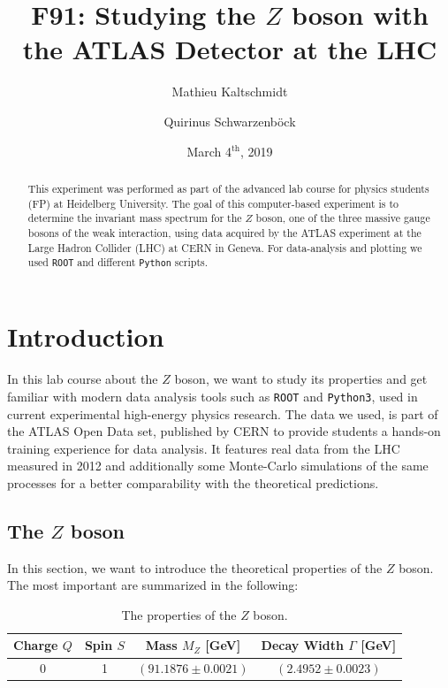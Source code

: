 \documentclass[twocolumn,
			   showpacs,%
               nofootinbib,
               aps,%
               prd,
               notitlepage,
               showkeys,
               10pt]{revtex4-1}
\begin{document}
{\hypersetup{allcolors=black}
\title{F91: Studying the $Z$ boson with the ATLAS Detector at the LHC }
\author{Mathieu Kaltschmidt}
\author{Quirinus Schwarzenb\"ock}

\date[Carried out in the week of  ]{March 4$^{\text{th}}$, 2019}


\begin{abstract}
This experiment was performed as part of the advanced lab course for physics students (FP) at Heidelberg University.
The goal of this computer-based experiment is to determine the invariant mass spectrum for the $Z$ boson, one of the three massive gauge bosons of the weak interaction, using data acquired by the ATLAS experiment at the Large Hadron Collider (LHC) at CERN in Geneva. For data-analysis  and plotting we used \verb|ROOT| and different \verb|Python| scripts.
\end{abstract}

\maketitle


}
\section{Introduction}
In this lab course about the $Z$ boson, we want to study its properties and get familiar with modern data analysis tools such as \verb|ROOT| and \verb|Python3|, used in current experimental high-energy physics research. The data we used, is part of the ATLAS Open Data set, published by CERN to provide students a hands-on training experience for data analysis. It features real data from the LHC measured in 2012 and additionally some Monte-Carlo simulations of the same processes for a better comparability with the theoretical predictions.

\subsection{The $Z$ boson}
In this section, we want to introduce the theoretical properties of the $Z$ boson. The most important are summarized in the following:

\begin{table}[!htbp]
	\centering
	\renewcommand{\arraystretch}{1.5}
	\begin{tabular}{c|c|c|c}
	Charge $Q$ & Spin $S$ & Mass $M_Z$ [GeV] & Decay Width $\Gamma$ [GeV] \\ \hline 
	 0 & 1 & $(91.1876 \pm 0.0021)$ & $(2.4952 \pm 0.0023)$ \\
		\end{tabular}
	\caption{\label{tab:Z_props}The properties of the $Z$ boson.}
\end{table}
\end{document}
